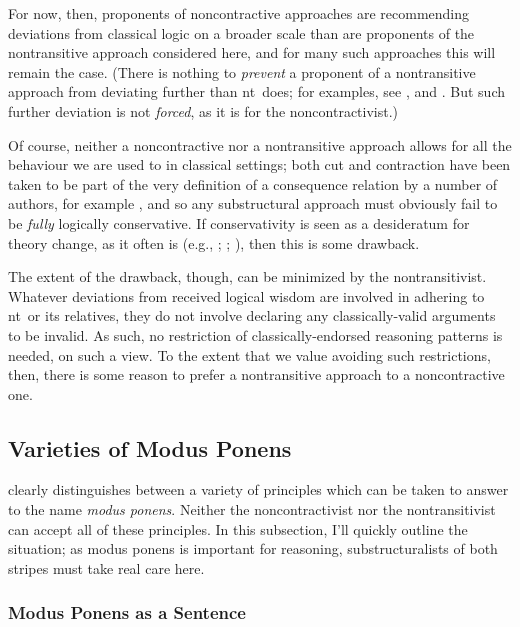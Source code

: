 \documentclass{ergoclass}
\newcommand{\ntlog}{{\sc nt}}
\renewcommand{\cite}{\citet}						%
\begin{document}
For now, then, proponents of noncontractive approaches are recommending deviations from classical logic on a broader scale than are proponents of the nontransitive approach considered here, and for many such approaches this will remain the case. (There is nothing to {\em prevent} a proponent of a nontransitive approach from deviating further than \ntlog\ does; for examples, see \cite{tennant:arl, weir:arntl}, and \cite{thomas:kss}. But such further deviation is not {\em forced}, as it is for the noncontractivist.)

Of course, neither a noncontractive nor a nontransitive approach allows for all the behaviour we are used to in classical settings; both cut and contraction have been taken to be part of the very definition of a consequence relation by a number of authors, for example \cite{humberstone:c}, and so any substructural approach must obviously fail to be {\em fully} logically conservative. If conservativity is seen as a desideratum for theory change, as it often is (e.g., \citealt{quine:tde}; \citealt{sklar:mc}; \citealt{lycan:jj}), then this is some drawback.

The extent of the drawback, though, can be minimized by the nontransitivist. Whatever deviations from received logical wisdom are involved in adhering to \ntlog\ or its relatives, they do not involve declaring any classically-valid arguments to be invalid. As such, no restriction of classically-endorsed reasoning patterns is needed, on such a view. To the extent that we value avoiding such restrictions, then, there is some reason to prefer a nontransitive approach to a noncontractive one. 



\subsection{Varieties of Modus Ponens}

\cite{zardini:nmp} clearly distinguishes between a variety of principles which can be taken to answer to the name {\em modus ponens}. Neither the noncontractivist nor the nontransitivist can accept all of these principles. In this subsection, I'll quickly outline the situation; as modus ponens is important for reasoning, substructuralists of both stripes must take real care here.

\subsubsection{Modus Ponens as a Sentence}
\end{document}
